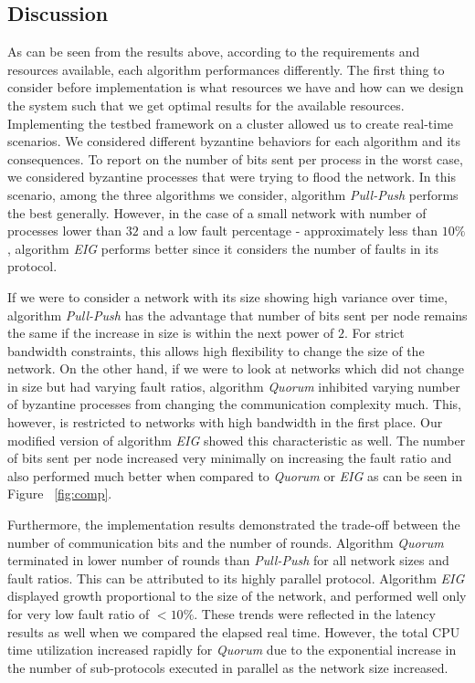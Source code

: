 ﻿
\subsection{Discussion}

As can be seen from the results above, according to the requirements and resources available, each algorithm performances differently. The first thing to consider before implementation is what resources we have and how can we design the system such that we get optimal results for the available resources. Implementing the testbed framework on a cluster allowed us to create real-time scenarios. We considered different byzantine behaviors for each algorithm and its consequences. To report on the number of bits sent per process in the worst case, we considered byzantine processes that were trying to flood the network. In this scenario, among the three algorithms we consider, algorithm \textit{Pull-Push} performs the best generally. However, in the case of a small network with number of processes lower than $32$ and a low fault percentage - approximately less than $10\%$, algorithm \textit{EIG} performs better since it considers the number of faults in its protocol. 

If we were to consider a network with its size showing high variance over time, algorithm \textit{Pull-Push} has the advantage that number of bits sent per node remains the same if the increase in size is within the next power of $2$. For strict bandwidth constraints, this allows high flexibility to change the size of the network. On the other hand, if we were to look at networks which did not change in size but had varying fault ratios, algorithm \textit{Quorum} inhibited varying number of byzantine processes from changing the communication complexity much. This, however, is restricted to networks with high bandwidth in the first place. Our modified version of algorithm \textit{EIG} showed this characteristic as well. The number of bits sent per node increased very minimally on increasing the fault ratio and also performed much better when compared to \textit{Quorum} or \textit{EIG} as can be seen in Figure ~\ref{fig:comp}.

Furthermore, the implementation results demonstrated the trade-off between the number of communication bits and the number of rounds. Algorithm \textit{Quorum} terminated in lower number of rounds than \textit{Pull-Push} for all network sizes and fault ratios. This can be attributed to its highly parallel protocol. Algorithm \textit{EIG} displayed growth proportional to the size of the network, and performed well only for very low fault ratio of $<10\%$. These trends were reflected in the latency results as well when we compared the elapsed real time. However, the total CPU time utilization increased rapidly for \textit{Quorum} due to the exponential increase in the number of sub-protocols executed in parallel as the network size increased.


